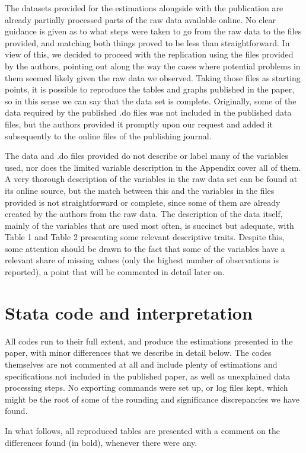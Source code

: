 \documentclass[draft.tex]{subfiles}
\begin{document}
The datasets provided for the estimations alongside with the publication are already partially processed parts of the raw data available online. No clear guidance is given as to what steps were taken to go from the raw data to the files provided, and matching both things proved to be less than straightforward. In view of this, we decided to proceed with the replication using the files provided by the authors, pointing out along the way the cases where potential problems in them seemed likely given the raw data we observed. Taking those files as starting points, it is possible to reproduce the tables and graphs published in the paper, so in this sense we can say that the data set is complete. Originally, some of the data required by the published .do files was not included in the published data files, but the authors provided it promptly upon our request and added it subsequently to the online files of the publishing journal.

The data and .do files provided do not describe or label many of the variables used, nor does the limited variable description in the Appendix cover all of them. A very thorough description of the variables in the raw data set can be found at its online source, but the match between this and the variables in the files provided is not straightforward or complete, since some of them are already created by the authors from the raw data. The description of the data itself, mainly of the variables that are used most often, is succinct but adequate, with Table 1 and Table 2 presenting some relevant descriptive traits. Despite this, some attention should be drawn to the fact that some of the variables have a relevant share of missing values (only the highest number of observations is reported), a point that will be commented in detail later on.

\section{Stata code and interpretation}
All codes run to their full extent, and produce the estimations presented in the paper, with minor differences that we describe in detail below. The codes themselves are not commented at all and include plenty of estimations and specifications not included in the published paper, as well as unexplained data processing steps. No exporting commands were set up, or log files kept, which might be the root of some of the rounding and significance discrepancies we have found. 

In what follows, all reproduced tables are presented with a comment on the differences found (in bold), whenever there were any.
\end{document}
